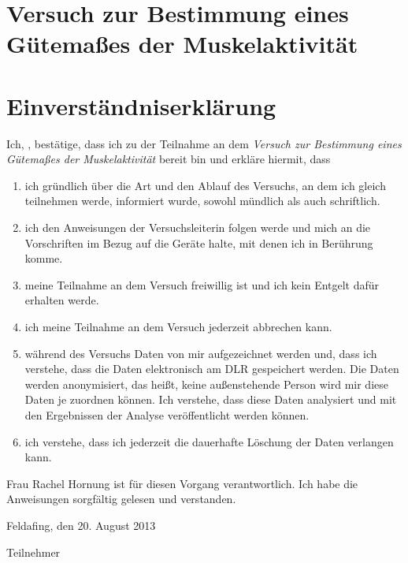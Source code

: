 \documentclass{article}
\begin{document}
\section*{Versuch zur Bestimmung eines Gütema\ss es der Muskelaktivität}
\vspace{1cm}

\section*{Einverständniserklärung}

Ich, \underline{\hspace{4cm}}, bestätige, dass ich zu der Teilnahme an dem \emph{Versuch zur Bestimmung eines G\"utema\ss es der Muskelaktivität} bereit bin und erkläre hiermit, dass
\begin{enumerate}
\item ich gr\"undlich \"uber die Art und den Ablauf des Versuchs, an dem ich gleich teilnehmen werde, informiert wurde, sowohl m\"undlich als auch schriftlich.
\item ich den Anweisungen der Versuchsleiterin folgen werde und mich an die Vorschriften im Bezug auf die Geräte halte, mit denen ich in Ber\"uhrung komme.
\item meine Teilnahme an dem Versuch freiwillig ist und ich kein Entgelt daf\"ur erhalten werde.
\item ich meine Teilnahme an dem Versuch jederzeit abbrechen kann.
\item während des Versuchs Daten von mir aufgezeichnet werden und, dass ich verstehe, dass die Daten elektronisch am DLR gespeichert werden. Die Daten werden anonymisiert, das hei\ss t, keine au\ss enstehende Person wird mir diese Daten je zuordnen können. Ich verstehe, dass diese Daten analysiert und mit den Ergebnissen der Analyse veröffentlicht werden können.
\item ich verstehe, dass ich jederzeit die dauerhafte Löschung der Daten verlangen kann.
\end{enumerate}
Frau Rachel Hornung ist f\"ur diesen Vorgang verantwortlich.
Ich habe die Anweisungen sorgfältig gelesen und verstanden.

\vspace{1cm}

Feldafing, den 20. August 2013

\vspace{2cm}
\underline{\hspace{4cm}}

Teilnehmer
\end{document}
